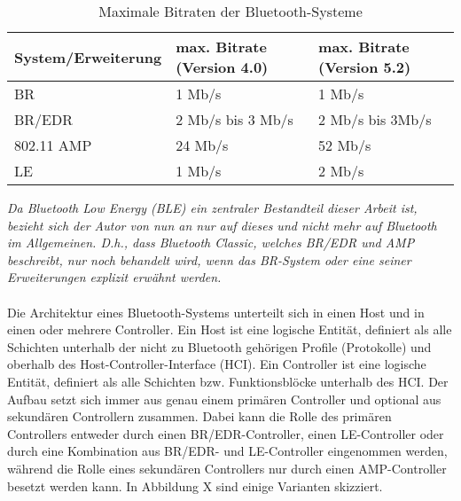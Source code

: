 \begin{table}
    \begin{tabular}[h]{|l|l|l|}
    \hline
    \textbf{System/Erweiterung} & \textbf{max. Bitrate (Version 4.0)} & \textbf{max. Bitrate (Version 5.2)} \\
    \hline
    BR          & 1 Mb/s \cite{BtSpec4.0_124}               & 1 Mb/s \cite{BtSpec5.2_188}           \\
    \hline
    BR/EDR      & 2 Mb/s bis 3 Mb/s \cite{BtSpec4.0_124}    & 2 Mb/s bis 3Mb/s \cite{BtSpec5.2_188} \\
    \hline
    802.11 AMP  & 24 Mb/s \cite{BtSpec4.0_123}              & 52 Mb/s \cite{BtSpec5.2_187}          \\
    \hline
    LE          & 1 Mb/s \cite{BtSpec4.0_126}               & 2 Mb/s \cite{BtSpec5.2_190}           \\
    \hline
    \end{tabular}
    \caption[Maximale Bitraten der Bluetooth-Systeme]{Maximale Bitraten der Bluetooth-Systeme}
\end{table}

\textit{Da Bluetooth Low Energy (BLE) ein zentraler Bestandteil dieser Arbeit ist, bezieht sich der Autor von nun an nur auf dieses und nicht mehr auf Bluetooth im Allgemeinen. D.h., dass Bluetooth Classic, welches BR/EDR und AMP beschreibt, nur noch behandelt wird, wenn das BR-System oder eine seiner Erweiterungen explizit erwähnt werden.}
\\\\
Die Architektur eines Bluetooth-Systems unterteilt sich in einen Host und in einen oder mehrere Controller. Ein Host ist eine logische Entität, definiert als alle Schichten unterhalb der nicht zu Bluetooth gehörigen Profile (Protokolle) und oberhalb des Host-Controller-Interface (HCI). Ein Controller ist eine logische Entität, definiert als alle Schichten bzw. Funktionsblöcke unterhalb des HCI. Der Aufbau setzt sich immer aus genau einem primären Controller und optional aus sekundären Controllern zusammen. Dabei kann die Rolle des primären Controllers entweder durch einen BR/EDR-Controller, einen LE-Controller oder durch eine Kombination aus BR/EDR- und LE-Controller eingenommen werden, während die Rolle eines sekundären Controllers nur durch einen AMP-Controller besetzt werden kann. In Abbildung X
 sind einige Varianten skizziert. 

